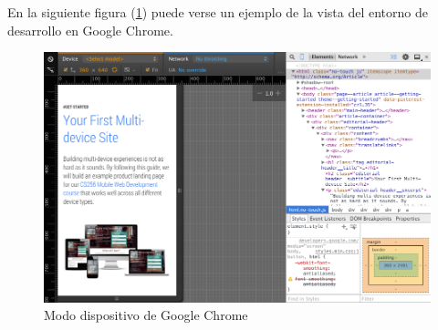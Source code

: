 En la siguiente figura (\ref{fig:google_device}) puede verse un ejemplo de la vista del entorno de desarrollo en Google Chrome.

\begin{figure}[!htp]
	 \centering
	 \includegraphics[scale=0.44]{fig/device_mode}
	 \caption{Modo dispositivo de Google Chrome}
	 \label{fig:google_device}
\end{figure}